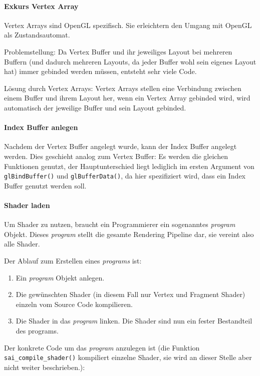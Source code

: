 \paragraph{Exkurs Vertex Array}
\label{sec:example:theexample:initphase:vao}
Vertex Arrays sind OpenGL spezifisch. Sie erleichtern den Umgang mit OpenGL als Zustandsautomat.

Problemstellung: Da Vertex Buffer und ihr jeweiliges Layout bei mehreren Buffern (und dadurch mehreren Layouts, da jeder Buffer wohl sein eigenes Layout hat) immer gebinded werden müssen, entsteht sehr viele Code.

Lösung durch Vertex Arrays: Vertex Arrays stellen eine Verbindung zwischen einem Buffer und ihrem Layout her, wenn ein Vertex Array gebinded wird, wird automatisch der jeweilige Buffer und sein Layout gebinded.

\paragraph{Index Buffer anlegen}
Nachdem der Vertex Buffer angelegt wurde, kann der Index Buffer angelegt werden. Dies geschieht analog zum Vertex Buffer:
Es werden die gleichen Funktionen genutzt, der Hauptunterschied liegt lediglich im ersten Argument von \texttt{glBindBuffer()} und \texttt{glBufferData()}, da hier spezifiziert wird, dass ein Index Buffer genutzt werden soll.

\paragraph{Shader laden}
\label{sec:example:theexample:initphase:program}
Um Shader zu nutzen, braucht ein Programmierer ein sogenanntes \textit{program} Objekt. Dieses \textit{program} stellt die gesamte Rendering Pipeline dar, sie vereint also alle Shader.

Der Ablauf zum Erstellen eines \textit{programs} ist:
\begin{enumerate}
    \item Ein \textit{program} Objekt anlegen.
    \item Die gewünschten Shader (in diesem Fall nur Vertex und Fragment Shader) einzeln vom Source Code kompilieren.
    \item Die Shader in das \textit{program} linken. Die Shader sind nun ein fester Bestandteil des programs.
\end{enumerate} 

Der konkrete Code um das \textit{program} anzulegen ist (die Funktion \texttt{sai\_compile\_shader()} kompiliert einzelne Shader, sie wird an dieser Stelle aber nicht weiter beschrieben.):

